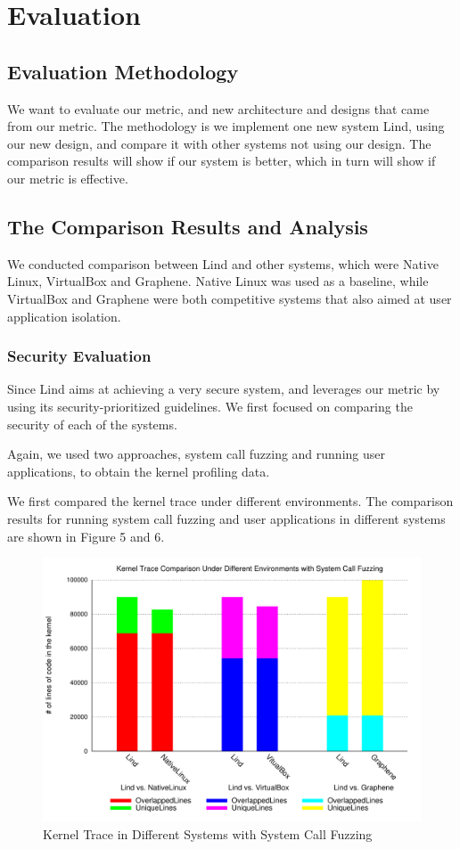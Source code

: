 \section{Evaluation}
\label{sec.evaluation}

\subsection{Evaluation Methodology}
We want to evaluate our metric, and new architecture and designs that came from our metric. 
The methodology is we implement one new system Lind, using our new design, and compare it 
with other systems not using our design. The comparison results will show if our system is better, 
which in turn will show if our metric is effective. 

\subsection{The Comparison Results and Analysis}
We conducted comparison between Lind and other systems, which were Native Linux, 
VirtualBox and Graphene. Native Linux was used as a baseline, while VirtualBox and Graphene
were both competitive systems that also aimed at user application isolation.

\subsubsection{Security Evaluation}
Since Lind aims at achieving a very secure system, and leverages our metric by using its 
security-prioritized guidelines. We first focused on comparing the security of each of the systems.

Again, we used two approaches, system call fuzzing and running user applications, to obtain the
kernel profiling data. 

We first compared the kernel trace under different environments.
The comparison results for running system call fuzzing and user applications in different systems 
are shown in Figure 5 and 6.

\begin{figure}[h]
\centering
\includegraphics[width=1.0\columnwidth]{diagram/lind_ccs15_diagram_03.pdf}
\caption{Kernel Trace in Different Systems with System Call Fuzzing}
\label{fig:different_systems_systemcallfuzzing_trace}
\end{figure}


